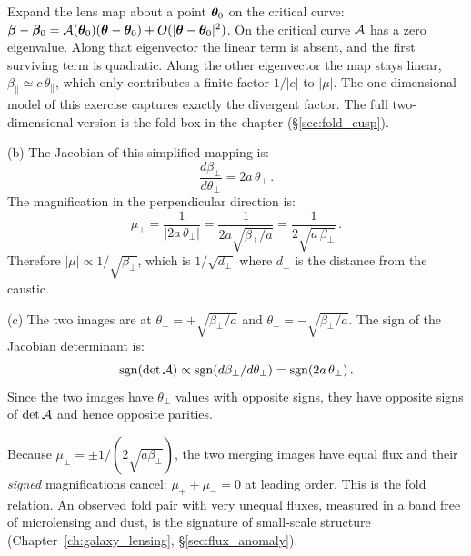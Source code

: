 \begin{annotation}
Expand the lens map about a point $\boldsymbol{\theta}_0$ on the critical curve:
$\boldsymbol{\beta} - \boldsymbol{\beta}_0 = \mathcal{A}(\boldsymbol{\theta}_0)(\boldsymbol{\theta}-\boldsymbol{\theta}_0) + O(|\boldsymbol{\theta}-\boldsymbol{\theta}_0|^2)$.
On the critical curve $\mathcal{A}$ has a zero eigenvalue.  Along that eigenvector
the linear term is absent, and the first surviving term is quadratic.  Along
the other eigenvector the map stays linear, $\beta_\parallel \simeq
c\,\theta_\parallel$, which only contributes a finite factor $1/|c|$ to
$|\mu|$.  The one-dimensional model of this exercise captures exactly the
divergent factor.  The full two-dimensional version is the fold box in the
chapter (\S\ref{sec:fold_cusp}).
\end{annotation}


(b) The Jacobian of this simplified mapping is:
\begin{equation*}
    \frac{d\beta_\perp}{d\theta_\perp} = 2a\,\theta_\perp \,.
\end{equation*}
The magnification in the perpendicular direction is:
\begin{equation*}
    \mu_\perp = \frac{1}{|2a\,\theta_\perp|}
    = \frac{1}{2a\sqrt{\beta_\perp/a}}
    = \frac{1}{2\sqrt{a\,\beta_\perp}} \,.
\end{equation*}
Therefore $|\mu| \propto 1/\sqrt{\beta_\perp}$, which is
$1/\sqrt{d_\perp}$ where $d_\perp$ is the distance from the
caustic. \checkmark

(c) The two images are at
$\theta_\perp = +\sqrt{\beta_\perp/a}$ and
$\theta_\perp = -\sqrt{\beta_\perp/a}$.  The sign of the Jacobian
determinant is:
\begin{equation*}
    \mathrm{sgn}(\det\mathcal{A}) \propto
    \mathrm{sgn}(d\beta_\perp/d\theta_\perp)
    = \mathrm{sgn}(2a\,\theta_\perp) \,.
\end{equation*}
Since the two images have $\theta_\perp$ values with opposite signs,
they have opposite signs of $\det\mathcal{A}$ and hence opposite
parities. \checkmark

\begin{annotation}
Because $\mu_\pm = \pm 1/(2\sqrt{a\beta_\perp})$, the two merging images have
equal flux and their \emph{signed} magnifications cancel: $\mu_+ + \mu_- = 0$
at leading order.  This is the fold relation.  An observed fold pair with very
unequal fluxes, measured in a band free of microlensing and dust, is the
signature of small-scale structure (Chapter~\ref{ch:galaxy_lensing},
\S\ref{sec:flux_anomaly}).
\end{annotation}


